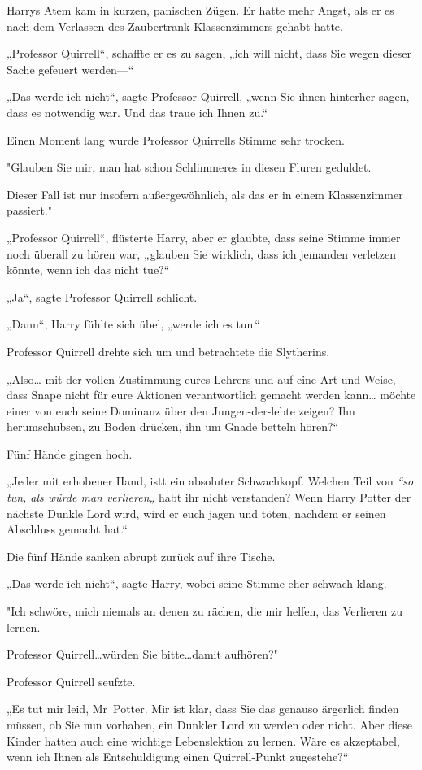 {Harrys Atem kam in kurzen, panischen Zügen. Er hatte mehr Angst, als er es nach dem Verlassen des Zaubertrank-Klassenzimmers gehabt hatte.

„Professor Quirrell“, schaffte er es zu sagen, „ich will nicht, dass Sie wegen dieser Sache gefeuert werden—“

„Das werde ich nicht“, sagte Professor Quirrell, „wenn Sie ihnen hinterher sagen, dass es notwendig war. Und das traue ich Ihnen zu.“

Einen Moment lang wurde Professor Quirrells Stimme sehr trocken.

"Glauben Sie mir, man hat schon Schlimmeres in diesen Fluren geduldet.

Dieser Fall ist nur insofern außergewöhnlich, als das er in einem Klassenzimmer passiert."

„Professor Quirrell“, flüsterte Harry, aber er glaubte, dass seine Stimme immer noch überall zu hören war, „glauben Sie wirklich, dass ich jemanden verletzen könnte, wenn ich das nicht tue?“

„Ja“, sagte Professor Quirrell schlicht.

„Dann“, Harry fühlte sich übel, „werde ich es tun.“

Professor Quirrell drehte sich um und betrachtete die Slytherins.

„Also… mit der vollen Zustimmung eures Lehrers und auf eine Art und Weise, dass Snape nicht für eure Aktionen verantwortlich gemacht werden kann… möchte einer von euch seine Dominanz über den Jungen-der-lebte zeigen? Ihn herumschubsen, zu Boden drücken, ihn um Gnade betteln hören?“

Fünf Hände gingen hoch.

„Jeder mit erhobener Hand, istt ein absoluter Schwachkopf. Welchen Teil von \emph{“so tun, als würde man verlieren„} habt ihr nicht verstanden? Wenn Harry Potter der nächste Dunkle Lord wird, wird er euch jagen und töten, nachdem er seinen Abschluss gemacht hat.“

Die fünf Hände sanken abrupt zurück auf ihre Tische.

„Das werde ich nicht“, sagte Harry, wobei seine Stimme eher schwach klang.

"Ich schwöre, mich niemals an denen zu rächen, die mir helfen, das Verlieren zu lernen.

Professor Quirrell…würden Sie bitte…damit aufhören?"

Professor Quirrell seufzte.

„Es tut mir leid, Mr~Potter. Mir ist klar, dass Sie das genauso ärgerlich finden müssen, ob Sie nun vorhaben, ein Dunkler Lord zu werden oder nicht. Aber diese Kinder hatten auch eine wichtige Lebenslektion zu lernen. Wäre es akzeptabel, wenn ich Ihnen als Entschuldigung einen Quirrell-Punkt zugestehe?“

}
